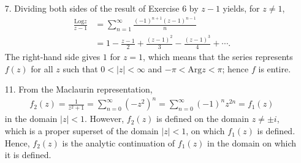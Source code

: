 \documentclass[a4paper,12pt]{article}
\begin{document}
\begin{enumerate}
    \item[7.]
        Dividing both sides of the result of Exercise 6 by $z - 1$ yields, for $z \neq 1$,
        \begin{align*}
            \frac{\text{Log} z}{z - 1} &= \sum_{n = 1}^\infty \frac{(-1)^{n + 1} (z - 1)^{n - 1}}{n} \\
            &= 1 - \frac{z - 1}{2} + \frac{(z - 1)^2}{3} - \frac{(z - 1)^3}{4} + \cdots.
        \end{align*}
        The right-hand side gives $1$ for $z = 1$, which means that the series represents $f(z)$ for all $z$ such that $0 < |z| < \infty$ and $-\pi < \text{Arg}z < \pi$; hence $f$ is entire.

    \item[11.]
        From the Maclaurin representation,
        \begin{align*}
            f_2(z) = \frac{1}{z^2 + 1} = \sum_{n = 0}^\infty (-z^2)^n = \sum_{n = 0}^\infty (-1)^n z^{2n} = f_1(z)
        \end{align*}
        in the domain $|z| < 1$. However, $f_2(z)$ is defined on the domain $z \neq \pm i$, which is a proper superset of the domain $|z| < 1$, on which $f_1(z)$ is defined. Hence, $f_2(z)$ is the analytic continuation of $f_1(z)$ in the domain on which it is defined.
\end{enumerate}
\end{document}
